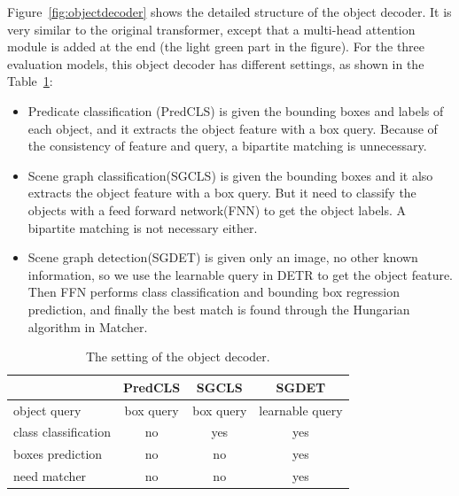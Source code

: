 Figure~\ref{fig:objectdecoder} shows the detailed structure of the object decoder. It is very similar to the original transformer, except that a multi-head attention module is added at the end (the light green part in the figure). For the three evaluation models, this object decoder has different settings, as shown in the Table~\ref{tab:objectdesetting}:
\begin{itemize}
	\item  Predicate classification (PredCLS) is given the bounding boxes and labels of each object, and it extracts the object feature with a box query. Because of the consistency of feature and query, a bipartite matching is unnecessary.
	\item Scene graph classification(SGCLS) is given the bounding boxes and it also extracts the object feature with a box query. But it need to classify the objects with a feed forward network(FNN) to get the object labels. A bipartite matching is not necessary either.
	\item Scene graph detection(SGDET) is given only an image, no other known information, so we use the learnable query in DETR to get the object feature. Then FFN performs class classification and bounding box regression prediction, and finally the best match is found through the Hungarian algorithm in Matcher.
\end{itemize}

\begin{table}[h]
	\centering
	\begin{tabular}{l|ccc}
		\hline
		& PredCLS     & SGCLS       & SGDET           \\ \hline
		object query     & box query & box query & learnable query \\
		class classification & no          & yes         & yes             \\
		boxes prediction & no          & no          & yes             \\
		need matcher     & no          & no          & yes             \\ \hline
	\end{tabular}
	\caption[The setting of the object decoder]{The setting of the object decoder.}
		\label{tab:objectdesetting}
\end{table}







